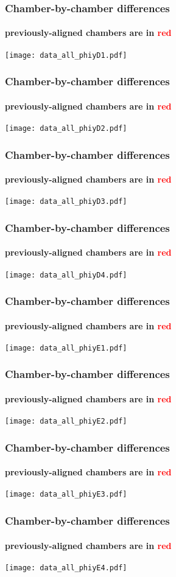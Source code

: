 \documentclass[compress]{beamer}
\begin{document}
\begin{frame}
\frametitle{Chamber-by-chamber differences}
\framesubtitle{previously-aligned chambers are in \textcolor{red}{red}}
\texttt{[image: data\_all\_phiyD1.pdf]}
\end{frame}

\begin{frame}
\frametitle{Chamber-by-chamber differences}
\framesubtitle{previously-aligned chambers are in \textcolor{red}{red}}
\texttt{[image: data\_all\_phiyD2.pdf]}
\end{frame}

\begin{frame}
\frametitle{Chamber-by-chamber differences}
\framesubtitle{previously-aligned chambers are in \textcolor{red}{red}}
\texttt{[image: data\_all\_phiyD3.pdf]}
\end{frame}

\begin{frame}
\frametitle{Chamber-by-chamber differences}
\framesubtitle{previously-aligned chambers are in \textcolor{red}{red}}
\texttt{[image: data\_all\_phiyD4.pdf]}
\end{frame}

\begin{frame}
\frametitle{Chamber-by-chamber differences}
\framesubtitle{previously-aligned chambers are in \textcolor{red}{red}}
\texttt{[image: data\_all\_phiyE1.pdf]}
\end{frame}

\begin{frame}
\frametitle{Chamber-by-chamber differences}
\framesubtitle{previously-aligned chambers are in \textcolor{red}{red}}
\texttt{[image: data\_all\_phiyE2.pdf]}
\end{frame}

\begin{frame}
\frametitle{Chamber-by-chamber differences}
\framesubtitle{previously-aligned chambers are in \textcolor{red}{red}}
\texttt{[image: data\_all\_phiyE3.pdf]}
\end{frame}

\begin{frame}
\frametitle{Chamber-by-chamber differences}
\framesubtitle{previously-aligned chambers are in \textcolor{red}{red}}
\texttt{[image: data\_all\_phiyE4.pdf]}
\end{frame}
\end{document}
